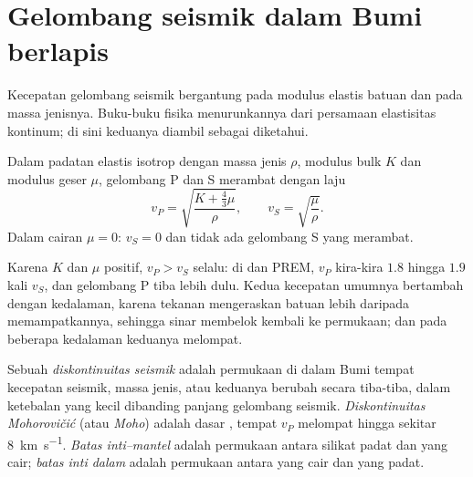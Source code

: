 \section{Gelombang seismik dalam Bumi berlapis}

Kecepatan gelombang seismik bergantung pada modulus elastis batuan dan pada massa jenisnya. Buku-buku fisika menurunkannya dari persamaan elastisitas kontinum; di sini keduanya diambil sebagai diketahui.

\begin{proposition}\label{prop:b1:layered-earth:speeds}
Dalam padatan elastis isotrop dengan massa jenis $\rho$, modulus bulk $K$ dan modulus geser $\mu$, gelombang P dan S merambat dengan laju
\[
  v_P = \sqrt{\frac{K + \tfrac43\mu}{\rho}}, \qquad v_S = \sqrt{\frac{\mu}{\rho}}.
\]
Dalam cairan $\mu = 0$: $v_S = 0$ dan tidak ada gelombang S yang merambat.
\end{proposition}
\admitted

Karena $K$ dan $\mu$ positif, $v_P > v_S$ selalu: di  dan  PREM, $v_P$ kira-kira $1.8$ hingga $1.9$ kali $v_S$, dan gelombang P tiba lebih dulu. Kedua kecepatan umumnya bertambah dengan kedalaman, karena tekanan mengeraskan batuan lebih daripada memampatkannya, sehingga sinar membelok kembali ke permukaan; dan pada beberapa kedalaman keduanya melompat.

\begin{definition}
\label{def:b1:layered-earth:discontinuity}
Sebuah \emph{diskontinuitas seismik} adalah permukaan di dalam Bumi tempat kecepatan seismik, massa jenis, atau keduanya berubah secara tiba-tiba, dalam ketebalan yang kecil dibanding panjang gelombang seismik. \emph{Diskontinuitas Mohorovičić} (atau \emph{Moho}) adalah dasar , tempat $v_P$ melompat hingga sekitar \qty{8}{km.s^{-1}}. \emph{Batas inti--mantel} adalah permukaan antara  silikat padat dan  yang cair; \emph{batas inti dalam} adalah permukaan antara  yang cair dan  yang padat.
\end{definition}

